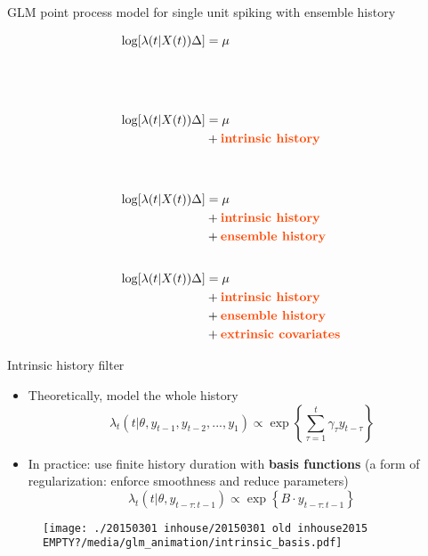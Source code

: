 \documentclass[svgnames,13pt]{beamer}
\DeclareRobustCommand{\emph}[1]{\textbf{{\color{emphasizecolor} #1}}}
\begin{document}
\begin{frame}{GLM point process model for single unit spiking with ensemble history}
\begin{overprint}
	\[\begin{aligned}\log[\lambda(t|X(t))\Delta] &= \mu \\
	&\phantom{{}+ \text{\emph{intrinsic history}}} \\
	&\phantom{{}+ \text{\emph{ensemble history}}}\\
	&\phantom{{}+ \text{\emph{extrinsic covariates}}}\end{aligned}\]
	\onslide<2>
	\[\begin{aligned}\log[\lambda(t|X(t))\Delta] &= \mu \\
	&{}+ \text{\emph{intrinsic history}} \\
	&\phantom{{}+ \text{\emph{ensemble history}}}\\
	&\phantom{{}+ \text{\emph{extrinsic covariates}}}\end{aligned}\]
	\onslide<3>
	\[\begin{aligned}\log[\lambda(t|X(t))\Delta] &= \mu \\
	&{}+ \text{\emph{intrinsic history}} \\
	&{}+ \text{\emph{ensemble history}}\\
	&\phantom{{}+ \text{\emph{extrinsic covariates}}}\end{aligned}\]
	\onslide<4>
	\[\begin{aligned}\log[\lambda(t|X(t))\Delta] &= \mu \\
	&{}+ \text{\emph{intrinsic history}} \\
	&{}+ \text{\emph{ensemble history}}\\
	&{}+ \text{\emph{extrinsic covariates}}\end{aligned}\]
\end{overprint}
\end{frame} 

\begin{frame}{Intrinsic history filter}
\begin{itemize}
	\item <1->Theoretically, model the whole history \[\lambda_t(t|\theta,y_{t-1},y_{t-2},...,y_1) \propto \exp\left\{ \sum_{\tau=1}^t \gamma_\tau y_{t-\tau} \right\}\]
	\item <2->In practice: use finite history duration with \emph{basis functions} (a form of regularization: enforce smoothness and reduce parameters) \[\lambda_t(t|\theta,y_{t-\tau:t-1}) \propto \exp\left\{ B \cdot y_{t-\tau:t-1} \right\}\]
	\end{itemize}
\begin{overprint}
	\begin{figure}\centering\texttt{[image: ./20150301 inhouse/20150301 old inhouse2015 EMPTY?/media/glm\_animation/intrinsic\_basis.pdf]}\\\end{figure}
\end{overprint}
\end{frame} 
\end{document}

